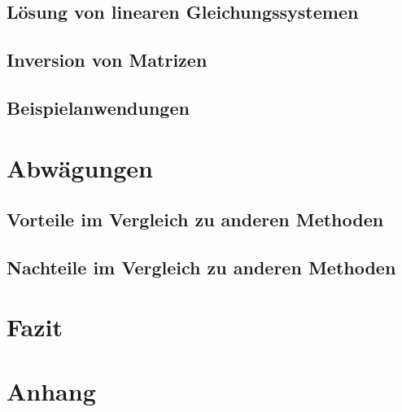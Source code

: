 \documentclass[a4paper, 12pt]{report}
\begin{document}
\begin{sloppypar}
\section{Lösung von linearen Gleichungssystemen}
\section{Inversion von Matrizen}
\section{Beispielanwendungen}
\chapter{Abwägungen}
\section{Vorteile im Vergleich zu anderen Methoden}
\section{Nachteile im Vergleich zu anderen Methoden}
\chapter{Fazit}
\chapter{Anhang}

\printbibliography
\end{sloppypar}
\end{document}
